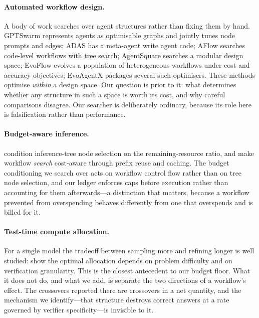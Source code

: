 \documentclass{article}
\begin{document}
\paragraph{Automated workflow design.} A body of work searches over agent
structures rather than fixing them by hand. GPTSwarm \citep{zhuge2024gptswarm}
represents agents as optimisable graphs and jointly tunes node prompts and
edges; ADAS \citep{hu2024adas} has a meta-agent write agent code; AFlow
\citep{zhang2025aflow} searches code-level workflows with tree search;
AgentSquare \citep{shang2024agentsquare} searches a modular design space; EvoFlow
\citep{zhang2025evoflow} evolves a population of heterogeneous workflows under
cost and accuracy objectives; EvoAgentX \citep{wang2025evoagentx} packages
several such optimisers. These methods optimise \emph{within} a design space.
Our question is prior to it: what determines whether any structure in such a
space is worth its cost, and why careful comparisons disagree. Our searcher is
deliberately ordinary, because its role here is falsification rather than
performance.

\paragraph{Budget-aware inference.} \citet{li2026bavt} condition inference-tree
node selection on the remaining-resource ratio, and \citet{agentuct2026} make
workflow \emph{search} cost-aware through prefix reuse and caching. The budget
conditioning we search over acts on workflow control flow rather than on tree
node selection, and our ledger enforces caps before execution rather than
accounting for them afterwards---a distinction that matters, because a workflow
prevented from overspending behaves differently from one that overspends and is
billed for it.

\paragraph{Test-time compute allocation.} For a single model the tradeoff
between sampling more and refining longer is well studied:
\citet{snell2024scaling} show the optimal allocation depends on problem
difficulty and \citet{verification2025granularity} on verification granularity.
This is the closest antecedent to our budget floor. What it does not do, and
what we add, is separate the two directions of a workflow's effect. The
crossovers reported there are crossovers in a net quantity, and the mechanism we
identify---that structure destroys correct answers at a rate governed by
verifier specificity---is invisible to it.
\end{document}
